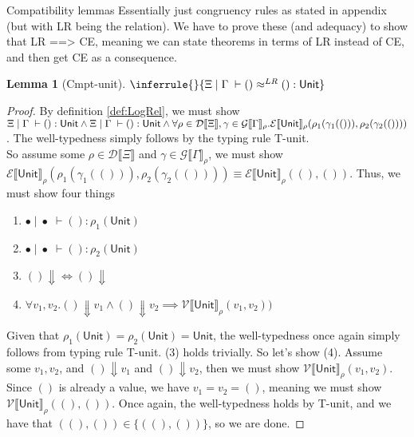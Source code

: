\documentclass[twoside,11pt,openright]{report}
\newtheorem{lemma}[theorem]{Lemma}
\theoremstyle{definition}
\newcommand{\val}{v}
\newcommand{\TT}{()}
\newcommand{\Tunit}{\mathsf{Unit}}
\newcommand{\venv}{\Gamma}
\newcommand{\tenv}{\Xi}
\newcommand{\empvenv}{\bullet}
\newcommand{\emptenv}{\bullet}
\newcommand{\jdg}[4]{#1 \; | \; #2 \; \vdash #3 : #4}
\newcommand{\jdgRel}[6]{#1 \; | \; #2 \; \vdash #3 \approx^{#4} #5 : #6}
\newcommand{\ValInp}[2]{\mathcal{V} \llbracket #1 \rrbracket_{#2}}
\newcommand{\ValInpGen}[2]{\ValInp{#1}{#2}(\val_1, \val_2)}
\newcommand{\ExpInp}[2]{\mathcal{E} \llbracket #1 \rrbracket_{#2}}
\newcommand{\VenvInp}[2]{\mathcal{G} \llbracket #1 \rrbracket_{#2}}
\newcommand{\TenvInp}[1]{\mathcal{D} \llbracket #1 \rrbracket}
\newcommand{\LogRel}[5]{\jdgRel{#1}{#2}{#3}{LR}{#4}{#5}}
\begin{document}
Compatibility lemmas
Essentially just congruency rules as stated in appendix (but with LR being the relation). We have to prove these (and adequacy) to show that LR ==> CE, meaning we can state theorems in terms of LR instead of CE, and then get CE as a consequence.
\begin{lemma}[Cmpt-unit]
  $\inferrule{ }{\LogRel{\tenv}{\venv}{\TT}{\TT}{\Tunit}}$
\end{lemma}
\begin{proof}
  By definition \ref*{def:LogRel}, we must show $\jdg{\tenv}{\venv}{\TT}{\Tunit} \land \jdg{\tenv}{\venv}{\TT}{\Tunit} \land\\ \forall \rho \in \TenvInp{\tenv}, \gamma \in \VenvInp{\venv}{\rho} . 
  \ExpInp{\Tunit}{\rho}(\rho_1(\gamma_1(\TT)), \rho_2(\gamma_2(\TT)))$. The well-typedness simply follows by the typing rule T-unit.\\
  So assume some $\rho \in \TenvInp{\tenv}$ and $\gamma \in \VenvInp{\venv}{\rho}$, we must show\\ $\ExpInp{\Tunit}{\rho}(\rho_1(\gamma_1(\TT)), \rho_2(\gamma_2(\TT))) \equiv \ExpInp{\Tunit}{\rho}(\TT, \TT)$. Thus, we must show four things
  \begin{enumerate}
    \item $\jdg{\emptenv}{\empvenv}{\TT}{\rho_1(\Tunit)}$
    \item $\jdg{\emptenv}{\empvenv}{\TT}{\rho_2(\Tunit)}$
    \item $\TT \Downarrow \iff \TT \Downarrow$
    \item $\forall \val_1, \val_2 . \TT \Downarrow \val_1 \land \TT \Downarrow \val_2 \implies \ValInpGen{\Tunit}{\rho})$
  \end{enumerate}
  Given that $\rho_1(\Tunit) = \rho_2(\Tunit) = \Tunit$, the well-typedness once again simply follows from typing rule T-unit. (3) holds trivially. So let's show (4). Assume some $\val_1, \val_2$, and $\TT \Downarrow \val_1$ and $\TT \Downarrow \val_2$, then we must show $\ValInpGen{\Tunit}{\rho}$. Since $\TT$ is already a value, we have $\val_1 = \val_2 = \TT$, meaning we must show $\ValInp{\Tunit}{\rho}(\TT, \TT)$. Once again, the well-typedness holds by T-unit, and we have that $(\TT, \TT) \in \{(\TT, \TT)\}$, so we are done.
\end{proof}
\end{document}
